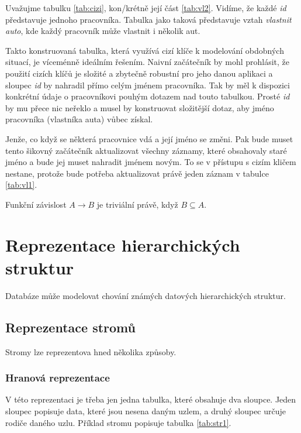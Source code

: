 \begin{upexample}
Uvažujme tabulku \ref{tab:cizi}, kon\-/krétně její část \ref{tab:vl2}. Vidíme, že každé \textit{id} představuje jednoho pracovníka. Tabulka jako taková představuje vztah \textit{vlastnit auto}, kde každý pracovník může vlastnit i několik aut.

Takto konstruovaná tabulka, která využívá cizí klíče k modelování obdobných situací, je víceménně ideálním řešením. Naivní začátečník by mohl prohlásit, že použití cizích klíčů je složité a zbytečně robustní pro jeho danou aplikaci a sloupec \textit{id} by nahradil přímo celým jménem pracovníka. Tak by měl k dispozici konkrétní údaje o pracovníkovi pouhým dotazem nad touto tabulkou. Prosté \textit{id} by mu přece nic neřeklo a musel by konstruovat složitější dotaz, aby jméno pracovníka (vlastníka auta) vůbec získal.

Jenže, co když se některá pracovnice vdá a její jméno se změni. Pak bude muset tento šikovný začátečník aktualizovat všechny záznamy, které obsahovaly staré jméno a bude jej muset nahradit jménem novým. To se v přístupu s cizím kličem nestane, protože bude potřeba aktualizovat právě jeden záznam v tabulce \ref{tab:vl1}.
\end{upexample}

\begin{upquote}
Funkční závislost $A \to B$ je triviální právě, když $B \subseteq A$.
\end{upquote}

\section{Reprezentace hierarchických struktur}
Databáze může modelovat chování známých datových hierarchických struktur.

\subsection{Reprezentace stromů}
Stromy lze reprezentova hned několika způsoby.

\subsubsection{Hranová reprezentace}
V této reprezentaci je třeba jen jedna tabulka, které obsahuje dva sloupce. Jeden sloupec popisuje data, které jsou nesena daným uzlem, a druhý sloupec určuje rodiče daného uzlu. Příklad stromu popisuje tabulka \ref{tab:str1}.

